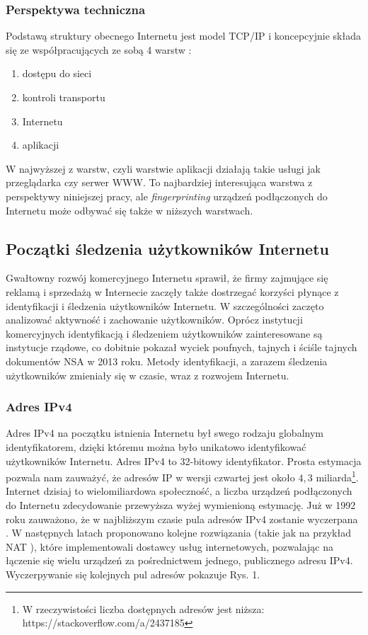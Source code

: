 \subsubsection{Perspektywa techniczna}
Podstawą struktury obecnego Internetu jest model TCP/IP i koncepcyjnie składa
się ze współpracujących ze sobą 4 warstw \cite{kahn1974protocol}:
\begin{enumerate}
	\item dostępu do sieci
	\item kontroli transportu
	\item Internetu
	\item aplikacji
\end{enumerate}
W najwyższej z warstw, czyli warstwie aplikacji działają takie usługi jak
przeglądarka czy serwer WWW. To najbardziej interesująca warstwa z perspektywy
niniejszej pracy, ale \emph{fingerprinting} urządzeń podłączonych do Internetu
może odbywać się także w niższych warstwach. %

\subsection{Początki śledzenia użytkowników Internetu}
Gwałtowny rozwój komercyjnego Internetu sprawił, że firmy zajmujące się reklamą
i sprzedażą w Internecie zaczęły także dostrzegać korzyści płynące z
identyfikacji i śledzenia użytkowników Internetu. W szczególności zaczęto
analizować aktywność i zachowanie użytkowników. Oprócz instytucji komercyjnych
identyfikacją i śledzeniem użytkowników zainteresowane są instytucje rządowe, co
dobitnie pokazał wyciek poufnych, tajnych i ściśle tajnych dokumentów NSA w 2013
roku. Metody identyfikacji, a zarazem śledzenia użytkowników zmieniały się w
czasie, wraz z rozwojem Internetu.

\subsubsection{Adres IPv4}
Adres IPv4 na początku istnienia Internetu był swego rodzaju globalnym
identyfikatorem, dzięki któremu można było unikatowo identyfikować użytkowników
Internetu. Adres IPv4 to 32-bitowy identyfikator. Prosta estymacja pozwala nam
zauważyć, że adresów IP w wersji czwartej jest około \(4,3\) miliarda\footnote{W
	rzeczywistości liczba dostępnych adresów jest niższa:
https://stackoverflow.com/a/2437185}. Internet dzisiaj to wielomiliardowa
społeczność, a liczba urządzeń podłączonych do Internetu zdecydowanie przewyższa
wyżej wymienioną estymację. Już w 1992 roku zauważono, że w najbliższym czasie
pula adresów IPv4 zostanie wyczerpana \cite{fuller1992supernetting}. W
następnych latach proponowano kolejne rozwiązania (takie jak na przykład NAT
\cite{egevang1994ip}), które implementowali dostawcy usług internetowych,
pozwalając na łączenie się wielu urządzeń za pośrednictwem jednego, publicznego
adresu IPv4. Wyczerpywanie się kolejnych pul adresów pokazuje Rys. 1.

